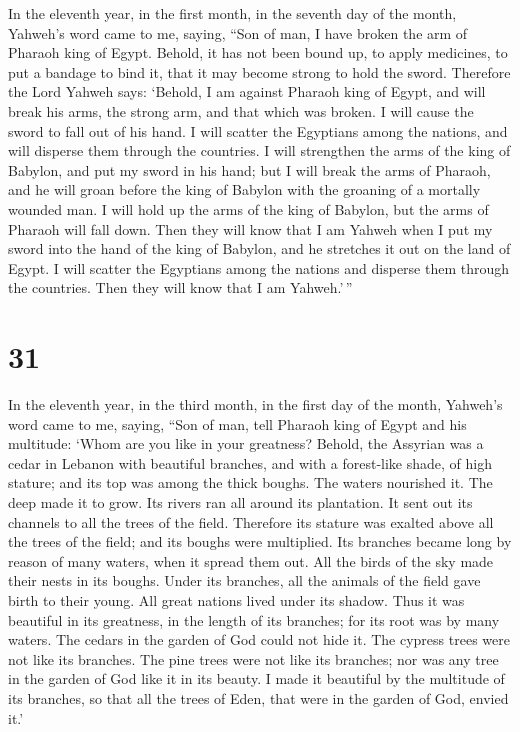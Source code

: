  In the eleventh year, in the first month, in the seventh
day of the month, Yahweh's word came to me, saying, 
``Son of man, I have broken the arm of Pharaoh king of Egypt. Behold, it
has not been bound up, to apply medicines, to put a bandage to bind it,
that it may become strong to hold the sword.  Therefore
the Lord Yahweh says: `Behold, I am against Pharaoh king of Egypt, and
will break his arms, the strong arm, and that which was broken. I will
cause the sword to fall out of his hand.  I will scatter
the Egyptians among the nations, and will disperse them through the
countries.  I will strengthen the arms of the king of
Babylon, and put my sword in his hand; but I will break the arms of
Pharaoh, and he will groan before the king of Babylon with the groaning
of a mortally wounded man.  I will hold up the arms of
the king of Babylon, but the arms of Pharaoh will fall down. Then they
will know that I am Yahweh when I put my sword into the hand of the king
of Babylon, and he stretches it out on the land of Egypt.
 I will scatter the Egyptians among the nations and
disperse them through the countries. Then they will know that I am
Yahweh.'\,''

\hypertarget{section-30}{%
\section{31}\label{section-30}}

 In the eleventh year, in the third month, in the first
day of the month, Yahweh's word came to me, saying,  ``Son
of man, tell Pharaoh king of Egypt and his multitude: `Whom are you like
in your greatness?  Behold, the Assyrian was a cedar in
Lebanon with beautiful branches, and with a forest-like shade, of high
stature; and its top was among the thick boughs.  The
waters nourished it. The deep made it to grow. Its rivers ran all around
its plantation. It sent out its channels to all the trees of the field.
 Therefore its stature was exalted above all the trees of
the field; and its boughs were multiplied. Its branches became long by
reason of many waters, when it spread them out.  All the
birds of the sky made their nests in its boughs. Under its branches, all
the animals of the field gave birth to their young. All great nations
lived under its shadow.  Thus it was beautiful in its
greatness, in the length of its branches; for its root was by many
waters.  The cedars in the garden of God could not hide
it. The cypress trees were not like its branches. The pine trees were
not like its branches; nor was any tree in the garden of God like it in
its beauty.  I made it beautiful by the multitude of its
branches, so that all the trees of Eden, that were in the garden of God,
envied it.'

